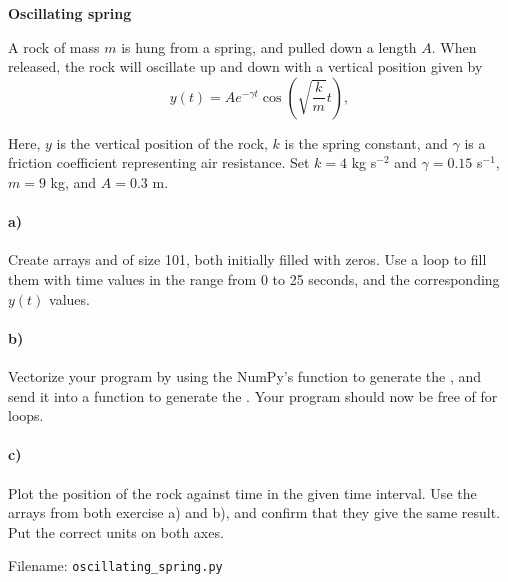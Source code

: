 \begin{Problem}{\textbf{Oscillating spring}}

\noindent A rock of mass $m$ is hung from a spring, and pulled down a length $A$. When
released, the rock will oscillate up and down with a
vertical position given by
\[
y(t) = A e^{-\gamma t}\cos\left(\sqrt{\frac{k}{m}}t\right),
\]

Here, $y$ is the vertical position of the rock, $k$ is the spring
constant, and $\gamma$ is a friction coefficient representing
air resistance. Set $k = 4$ kg s$^{-2}$ and $\gamma = 0.15$ s$^{-1}$,
$m = 9$ kg, and $A = 0.3$ m.
\paragraph{a)} Create arrays  and
 of size 101, both initially filled with zeros.
Use a  loop to fill them with time values in the range from 0 to 25 seconds, and the
corresponding $y(t)$ values.
\paragraph{b)} Vectorize your program by using the NumPy's 
function to generate the , and
send it into a function  to generate the . Your program should now be free of
for loops.
\paragraph{c)} Plot the position of the rock against time in the given time
interval. Use the arrays from both exercise a) and b), and confirm that they
give the same result. Put the correct units on both axes.

Filename: \texttt{oscillating\_spring.py}
\end{Problem}

